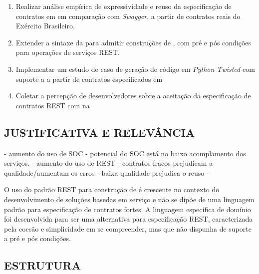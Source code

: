 \begin{enumerate}
  \item Realizar análise empírica de expressividade e reuso da especificação de
  contratos em \neoidl em comparação com \textit{Swagger}, a partir de contratos
  reais do Exército Brasileiro.
  \item Extender a sintaxe da \neoidl para admitir construções de 
  \designbycontract, com pré e pós condições para operações de serviços REST.
  \item Implementar um estudo de caso de geração de código em \textit{Python
  Twisted} com suporte a \designbycontract a partir de contratos especificados
  em \neoidl
  \item Coletar a percepção de desenvolvedores sobre a aceitação da
  especificação de contratos REST com \designbycontract na \neoidl
\end{enumerate}


\subsection{JUSTIFICATIVA E RELEVÂNCIA}
\vspace{-6mm}

- aumento do uso de SOC
- potencial do SOC está no baixo acomplamento dos serviços.
- aumento do uso de REST
- contratos fracos prejudicam a qualidade/aumentam os erros
- baixa qualidade prejudica o reuso
- 


O uso do padrão REST para construção de \ws é crescente 
no contexto do desenvolvimento de soluções basedas em serviço e não se dipõe de
uma linguagem padrão para especificação de contratos fortes. A linguagem
específica de domínio \neoidl foi desenvolvida para ser uma alternativa para
especificação REST, caracterizada pela coesão e simplicidade em se compreender,
mas que não dispunha de suporte a pré e pós condições.


\subsection{ESTRUTURA}
\vspace{-6mm}


